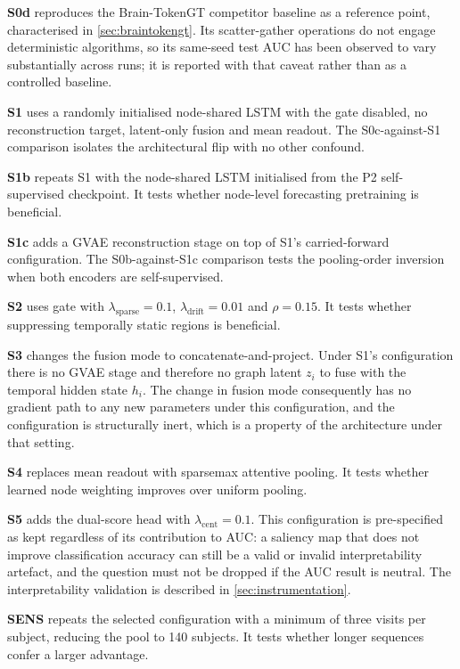 \textbf{S0d} reproduces the Brain-TokenGT competitor baseline \parencite{dong2023braintokengt}
as a reference point, characterised in \autoref{sec:braintokengt}. Its scatter-gather
operations do not engage deterministic algorithms, so
its same-seed test \ac{AUC} has been observed to vary substantially across runs; it is
reported with that caveat rather than as a controlled baseline.

\textbf{S1} uses a randomly initialised node-shared \ac{LSTM} with the gate disabled, no
reconstruction target, latent-only fusion and mean readout. The S0c-against-S1
comparison isolates the architectural flip with no other confound.

\textbf{S1b} repeats S1 with the node-shared \ac{LSTM} initialised from the P2
self-supervised checkpoint. It tests whether node-level forecasting pretraining is
beneficial.

\textbf{S1c} adds a \ac{GVAE} reconstruction stage on top of S1's carried-forward configuration. The
S0b-against-S1c comparison tests the pooling-order inversion when both encoders are
self-supervised.

\textbf{S2} uses gate with $\lambda_{\text{sparse}} = 0.1$,
$\lambda_{\text{drift}} = 0.01$ and $\rho = 0.15$. It tests whether suppressing
temporally static regions is beneficial.

\textbf{S3} changes the fusion mode to concatenate-and-project. Under S1's configuration there is no \ac{GVAE} stage and therefore no
graph latent $z_i$ to fuse with the temporal hidden state $h_i$. The change in fusion
mode consequently has no gradient path to any new parameters under this configuration, and
the configuration is structurally inert, which is a property of the architecture under that
setting.

\textbf{S4} replaces mean readout with sparsemax attentive pooling. It tests whether
learned node weighting improves over uniform pooling.

\textbf{S5} adds the dual-score head with $\lambda_{\text{cent}} = 0.1$. This configuration is
pre-specified as kept regardless of its contribution to \ac{AUC}: a saliency map that does
not improve classification accuracy can still be a valid or invalid interpretability
artefact, and the question must not be dropped if the \ac{AUC} result is neutral. The
interpretability validation is described in \autoref{sec:instrumentation}.

\textbf{SENS} repeats the selected configuration with a minimum of three visits per
subject, reducing the pool to 140 subjects. It tests whether longer sequences confer a larger advantage.

